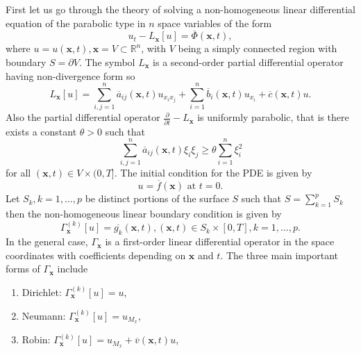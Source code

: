 \documentclass[\main/thesis.tex]{subfiles}
\begin{document}
First let us go through the theory of solving a non-homogeneous linear differential 
equation of the parabolic type in $n$ space variables of the form
\begin{equation}
u_t - L_{\boldsymbol{x}}[u] {=} \overline{\Phi}(\boldsymbol{x}, t),
\label{eq:parabolic_pde_eq}
\end{equation}
where $u {=} u(\boldsymbol{x}, t), \boldsymbol{x} {=} V {\subset} \mathbb{R}^n$, with $V$ being a simply connected region with boundary $S {=} \partial V$.
The symbol $L_{\boldsymbol{x}}$ is a second-order partial differential operator having non-divergence form so
\begin{equation}
L_{\boldsymbol{x}}[u] {=} \sum_{i, j {=} 1}^{n} \overline{a}_{ij}(\boldsymbol{x}, t) u_{x_ix_j}
                      {+} \sum_{i{=}1}^n \overline{b}_i(\boldsymbol{x}, t) u_{x_i}
                      {+} \overline{c}(\boldsymbol{x}, t) u.
\label{eq:linear_second_order_spatial_op}
\end{equation}
Also the partial differential operator $\frac{\partial}{\partial t} {-} L_{\boldsymbol{x}}$
is uniformly parabolic, that is there exists a constant $\theta {>} 0$ such that
$$\sum_{i,j{=}1}^{n} \overline{a}_{ij}(\boldsymbol{x}, t) \xi_i \xi_j {\ge} \theta \sum_{i=1}^{n} \xi_i^2$$
for all $(\boldsymbol{x}, t) {\in} V {\times} (0, T]$. The initial condition for the PDE is given by
\begin{equation}
u {=} \overline{f}(\boldsymbol{x}) \text{ at } t {=} 0.
\label{eq:ic_parabolic_pde}
\end{equation}
Let $S_k, k {=} 1, ..., p$ be distinct portions of the surface $S$ such that $S {=} \sum_{k=1}^{p} S_k$ then the non-homogeneous linear boundary condition is given by
\begin{equation}
\Gamma_{\boldsymbol{x}}^{(k)}[u] {=} \overline{g_k}(\boldsymbol{x}, t), (\boldsymbol{x}, t) {\in} S_k {\times} [0, T], k {=} 1, ..., p.
\label{eq:bc_parabolic_pde}
\end{equation}
In the general case, $\Gamma_{\boldsymbol{x}}$ is a first-order linear differential operator in the space coordinates with coefficients depending on $\boldsymbol{x}$ and $t$.
The three main important forms of $\Gamma_{\boldsymbol{x}}$ include
\begin{enumerate}
\item Dirichlet: $\Gamma_{\boldsymbol{x}}^{(k)}[u] {=} u$, 
\item Neumann: $\Gamma_{\boldsymbol{x}}^{(k)}[u] {=} u_{M_x}$,
\item Robin: $\Gamma_{\boldsymbol{x}}^{(k)}[u] {=} u_{M_x} {+} \overline{v}(\boldsymbol{x}, t)u$,
\end{enumerate}
\end{document}
